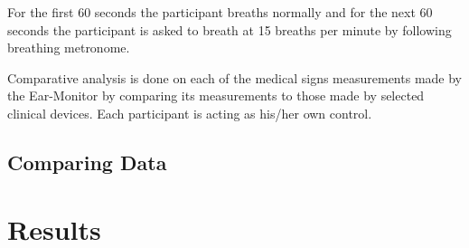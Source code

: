 For the first 60 seconds the participant breaths normally and for the next 60 seconds the participant is asked to breath at 15 breaths per minute by following breathing metronome.

\medskip

Comparative analysis is done on each of the medical signs measurements made by the Ear-Monitor by comparing its measurements to those made by selected clinical devices. Each participant is acting as his/her own control.

\subsection{Comparing Data}

\section{Results}


